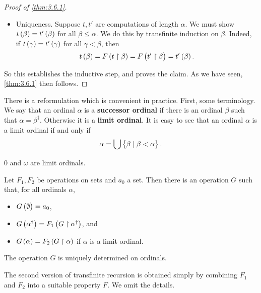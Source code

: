 \begin{proof}[Proof of \ref{thm:3.6.1}]
\begin{itemize}
We extend $ s $ to a function $ t $ with domain $ \alpha^\dagger $ by setting $ t\br{\alpha} = F\br{s} $. Then for all $ \beta \le \alpha $, we have that $ t\br{\beta} = F\br{t \upharpoonright \beta} $. So $ t $ is a computation of length $ \alpha $ based on $ F $.
\item Uniqueness. Suppose $ t, t' $ are computations of length $ \alpha $. We must show $ t\br{\beta} = t'\br{\beta} $ for all $ \beta \le \alpha $. We do this by transfinite induction on $ \beta $. Indeed, if $ t\br{\gamma} = t'\br{\gamma} $ for all $ \gamma < \beta $, then
$$ t\br{\beta} = F\br{t \upharpoonright \beta} = F\br{t' \upharpoonright \beta} = t'\br{\beta}. $$
\end{itemize}
So this establishes the inductive step, and proves the claim. As we have seen, \ref{thm:3.6.1} then follows.
\end{proof}

There is a reformulation which is convenient in practice. First, some terminology. We say that an ordinal $ \alpha $ is a \textbf{successor ordinal} if there is an ordinal $ \beta $ such that $ \alpha = \beta^\dagger $. Otherwise it is a \textbf{limit ordinal}. It is easy to see that an ordinal $ \alpha $ is a limit ordinal if and only if
$$ \alpha = \bigcup \cbr{\beta \mid \beta < \alpha}. $$

\begin{example*}
$ 0 $ and $ \omega $ are limit ordinals.
\end{example*}

\begin{theorem}
Let $ F_1, F_2 $ be operations on sets and $ a_0 $ a set. Then there is an operation $ G $ such that, for all ordinals $ \alpha $,
\begin{itemize}
\item $ G\br{\emptyset} = a_0 $,
\item $ G\br{\alpha^\dagger} = F_1\br{G \upharpoonright \alpha^\dagger} $, and
\item $ G\br{\alpha} = F_2\br{G \upharpoonright \alpha} $ if $ \alpha $ is a limit ordinal.
\end{itemize}
The operation $ G $ is uniquely determined on ordinals.
\end{theorem}

The second version of transfinite recursion is obtained simply by combining $ F_1 $ and $ F_2 $ into a suitable property $ F $. We omit the details.



